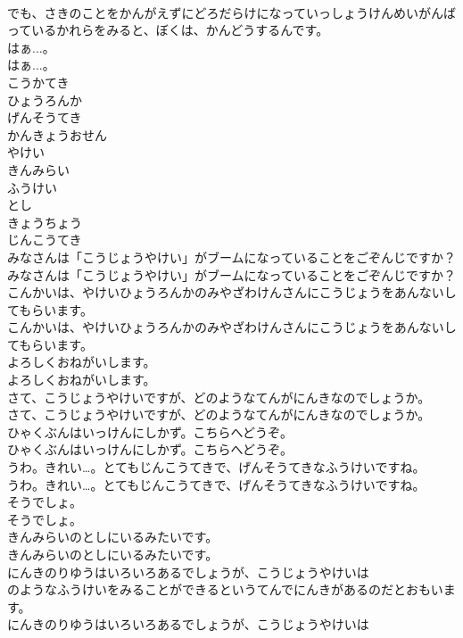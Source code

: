 \documentclass[8pt]{extreport}
\begin{document}
\begin{CJK}{UTF8}{min}
\\	でも、さきのことをかんがえずにどろだらけになっていっしょうけんめいがんばっているかれらをみると、ぼくは、かんどうするんです。
\\	はぁ...。
\\	はぁ...。
\\	こうかてき
\\	ひょうろんか
\\	げんそうてき
\\	かんきょうおせん
\\	やけい
\\	きんみらい
\\	ふうけい
\\	とし
\\	きょうちょう
\\	じんこうてき
\\	みなさんは「こうじょうやけい」がブームになっていることをごぞんじですか？
\\	みなさんは「こうじょうやけい」がブームになっていることをごぞんじですか？
\\	こんかいは、やけいひょうろんかのみやざわけんさんにこうじょうをあんないしてもらいます。
\\	こんかいは、やけいひょうろんかのみやざわけんさんにこうじょうをあんないしてもらいます。
\\	よろしくおねがいします。
\\	よろしくおねがいします。
\\	さて、こうじょうやけいですが、どのようなてんがにんきなのでしょうか。
\\	さて、こうじょうやけいですが、どのようなてんがにんきなのでしょうか。
\\	ひゃくぶんはいっけんにしかず。こちらへどうぞ。
\\	ひゃくぶんはいっけんにしかず。こちらへどうぞ。
\\	うわ。きれい…。とてもじんこうてきで、げんそうてきなふうけいですね。
\\	うわ。きれい…。とてもじんこうてきで、げんそうてきなふうけいですね。
\\	そうでしょ。
\\	そうでしょ。
\\	きんみらいのとしにいるみたいです。
\\	きんみらいのとしにいるみたいです。
\\	にんきのりゆうはいろいろあるでしょうが、こうじょうやけいは
\\	のようなふうけいをみることができるというてんでにんきがあるのだとおもいます。
\\	にんきのりゆうはいろいろあるでしょうが、こうじょうやけいは

\end{CJK}
\end{document}
